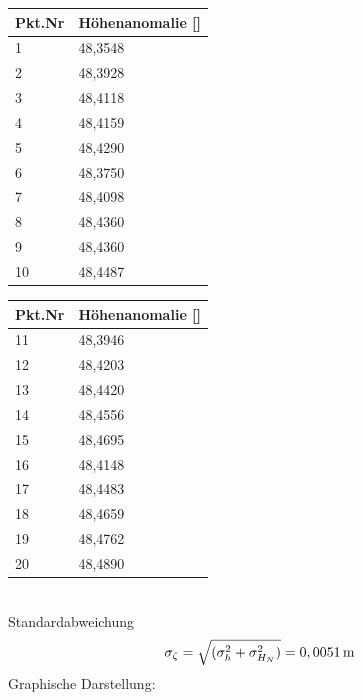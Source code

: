 \begin{table}[ht] \centering
	\begin{tabular}{|l|l|}
		\hline
		Pkt.Nr & Höhenanomalie [\ut{m}] \\ \hline
		1     & 48,3548       \\ \hline
		2     & 48,3928       \\ \hline
		3     & 48,4118       \\ \hline
		4     & 48,4159       \\ \hline
		5     & 48,4290       \\ \hline
		6     & 48,3750       \\ \hline
		7     & 48,4098       \\ \hline
		8     & 48,4360       \\ \hline
		9     & 48,4360       \\ \hline
		10    & 48,4487       \\ \hline
	\end{tabular}
	\begin{tabular}{|l|l|}
		\hline
		Pkt.Nr & Höhenanomalie [\ut{m}] \\ \hline
		11    & 48,3946       \\ \hline
		12    & 48,4203       \\ \hline
		13    & 48,4420      \\ \hline
		14    & 48,4556       \\ \hline
		15    & 48,4695      \\ \hline
		16    & 48,4148       \\ \hline
		17    & 48,4483       \\ \hline
		18    & 48,4659       \\ \hline
		19    & 48,4762       \\ \hline
		20    & 48,4890       \\ \hline
	\end{tabular}
\end{table}
\\
Standardabweichung
\begin{equation*}
	\sigma_{\zeta} = \sqrt{(\sigma_h^2 + \sigma_{H_N}^2)} = 0,0051 \,\mathrm{m}
\end{equation*}
Graphische Darstellung:
